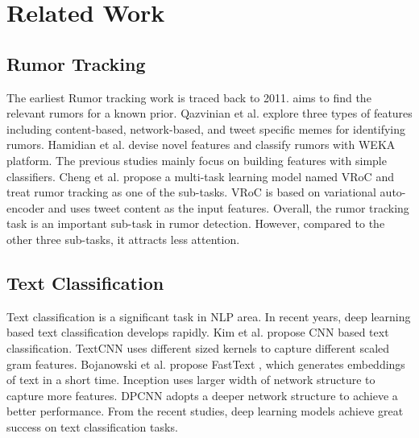\section{Related Work}
\label{sec:related}

\subsection{Rumor Tracking}
\label{sec:rumortracking}
The earliest Rumor tracking work is traced back to 2011. \cite{DBLP:journals/csur/ZubiagaABLP18} aims to find the relevant rumors for a known prior. Qazvinian et al. \cite{DBLP:conf/emnlp/QazvinianRRM11} explore three types of features including content-based, network-based, and tweet specific memes for identifying rumors. Hamidian et al. \cite{DBLP:journals/corr/abs-1912-08926} devise novel features and classify rumors with WEKA platform. The previous studies mainly focus on building features with simple classifiers. Cheng et al. \cite{DBLP:conf/www/ChengNB20} propose a multi-task learning model named VRoC and treat rumor tracking as one of the sub-tasks. VRoC is based on variational auto-encoder and uses tweet content as the input features. Overall, the rumor tracking task is an important sub-task in rumor detection. However, compared to the other three sub-tasks, it attracts less attention.

\subsection{Text Classification}
\label{sec:textclassification}
Text classification is a significant task in NLP area. In recent years, deep learning based text classification develops rapidly. Kim et al. \cite{DBLP:conf/emnlp/Kim14} propose CNN based text classification. TextCNN uses different sized kernels to capture different scaled gram features. Bojanowski et al. propose FastText \cite{DBLP:journals/tacl/BojanowskiGJM17}, which generates embeddings of text in a short time. Inception \cite{DBLP:journals/corr/SzegedyLJSRAEVR14} uses larger width of network structure to capture more features. DPCNN \cite{DBLP:conf/acl/JohnsonZ17} adopts a deeper network structure to achieve a better performance. From the recent studies, deep learning models achieve great success on text classification tasks.


